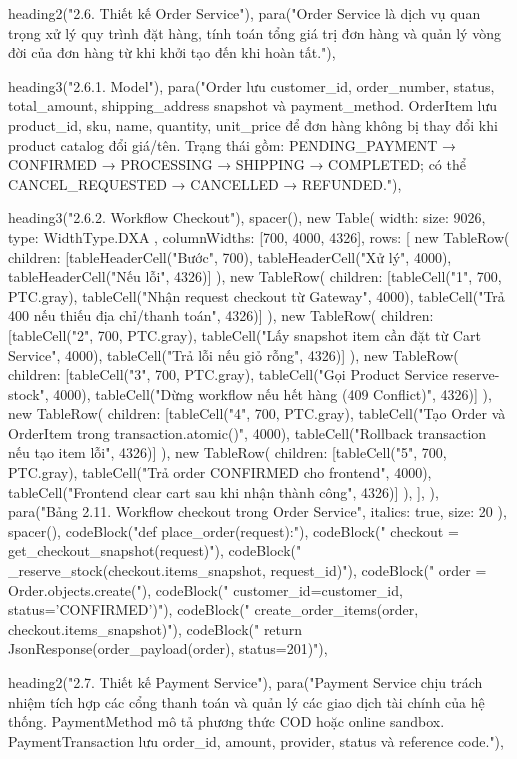   heading2("2.6. Thiết kế Order Service"),
  para("Order Service là dịch vụ quan trọng xử lý quy trình đặt hàng, tính toán tổng giá trị đơn hàng và quản lý vòng đời của đơn hàng từ khi khởi tạo đến khi hoàn tất."),

  heading3("2.6.1. Model"),
  para("Order lưu customer_id, order_number, status, total_amount, shipping_address snapshot và payment_method. OrderItem lưu product_id, sku, name, quantity, unit_price để đơn hàng không bị thay đổi khi product catalog đổi giá/tên. Trạng thái gồm: PENDING_PAYMENT → CONFIRMED → PROCESSING → SHIPPING → COMPLETED; có thể CANCEL_REQUESTED → CANCELLED → REFUNDED."),

  heading3("2.6.2. Workflow Checkout"),
  spacer(),
  new Table({
    width: { size: 9026, type: WidthType.DXA },
    columnWidths: [700, 4000, 4326],
    rows: [
      new TableRow({ children: [tableHeaderCell("Bước", 700), tableHeaderCell("Xử lý", 4000), tableHeaderCell("Nếu lỗi", 4326)] }),
      new TableRow({ children: [tableCell("1", 700, PTC.gray), tableCell("Nhận request checkout từ Gateway", 4000), tableCell("Trả 400 nếu thiếu địa chỉ/thanh toán", 4326)] }),
      new TableRow({ children: [tableCell("2", 700, PTC.gray), tableCell("Lấy snapshot item cần đặt từ Cart Service", 4000), tableCell("Trả lỗi nếu giỏ rỗng", 4326)] }),
      new TableRow({ children: [tableCell("3", 700, PTC.gray), tableCell("Gọi Product Service reserve-stock", 4000), tableCell("Dừng workflow nếu hết hàng (409 Conflict)", 4326)] }),
      new TableRow({ children: [tableCell("4", 700, PTC.gray), tableCell("Tạo Order và OrderItem trong transaction.atomic()", 4000), tableCell("Rollback transaction nếu tạo item lỗi", 4326)] }),
      new TableRow({ children: [tableCell("5", 700, PTC.gray), tableCell("Trả order CONFIRMED cho frontend", 4000), tableCell("Frontend clear cart sau khi nhận thành công", 4326)] }),
    ],
  }),
  para("Bảng 2.11. Workflow checkout trong Order Service", { italics: true, size: 20 }),
  spacer(),
  codeBlock("def place_order(request):"),
  codeBlock("    checkout = get_checkout_snapshot(request)"),
  codeBlock("    _reserve_stock(checkout.items_snapshot, request_id)"),
  codeBlock("    order = Order.objects.create("),
  codeBlock("        customer_id=customer_id, status='CONFIRMED')"),
  codeBlock("    create_order_items(order, checkout.items_snapshot)"),
  codeBlock("    return JsonResponse(order_payload(order), status=201)"),

  heading2("2.7. Thiết kế Payment Service"),
  para("Payment Service chịu trách nhiệm tích hợp các cổng thanh toán và quản lý các giao dịch tài chính của hệ thống. PaymentMethod mô tả phương thức COD hoặc online sandbox. PaymentTransaction lưu order_id, amount, provider, status và reference code."),

